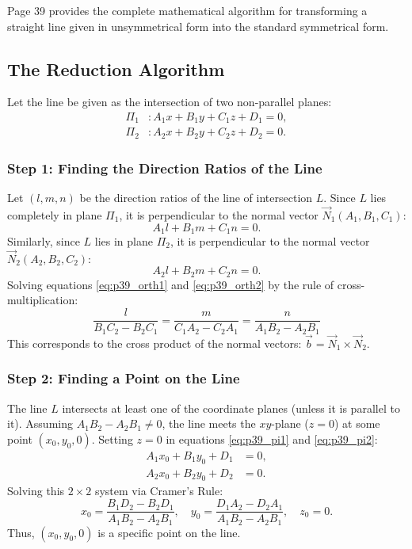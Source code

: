 \begin{conceptbox}
Page 39 provides the complete mathematical algorithm for transforming a straight line given in unsymmetrical form into the standard symmetrical form.
\end{conceptbox}

\subsection{The Reduction Algorithm}
Let the line be given as the intersection of two non-parallel planes:
\begin{align}
    \Pi_1 &: A_1 x + B_1 y + C_1 z + D_1 = 0, \label{eq:p39_pi1} \\
    \Pi_2 &: A_2 x + B_2 y + C_2 z + D_2 = 0. \label{eq:p39_pi2}
\end{align}

\subsubsection{Step 1: Finding the Direction Ratios of the Line}
Let $(l, m, n)$ be the direction ratios of the line of intersection $L$.
Since $L$ lies completely in plane $\Pi_1$, it is perpendicular to the normal vector $\vec{N}_1(A_1, B_1, C_1)$:
\begin{equation}
    A_1 l + B_1 m + C_1 n = 0. \label{eq:p39_orth1}
\end{equation}
Similarly, since $L$ lies in plane $\Pi_2$, it is perpendicular to the normal vector $\vec{N}_2(A_2, B_2, C_2)$:
\begin{equation}
    A_2 l + B_2 m + C_2 n = 0. \label{eq:p39_orth2}
\end{equation}
Solving equations \eqref{eq:p39_orth1} and \eqref{eq:p39_orth2} by the rule of cross-multiplication:
\begin{equation}
    \boxed{\frac{l}{B_1 C_2 - B_2 C_1} = \frac{m}{C_1 A_2 - C_2 A_1} = \frac{n}{A_1 B_2 - A_2 B_1}}
\end{equation}
This corresponds to the cross product of the normal vectors: $\vec{b} = \vec{N}_1 \times \vec{N}_2$.

\subsubsection{Step 2: Finding a Point on the Line}
The line $L$ intersects at least one of the coordinate planes (unless it is parallel to it).
Assuming $A_1 B_2 - A_2 B_1 \neq 0$, the line meets the $xy$-plane ($z = 0$) at some point $(x_0, y_0, 0)$.
Setting $z = 0$ in equations \eqref{eq:p39_pi1} and \eqref{eq:p39_pi2}:
\begin{align}
    A_1 x_0 + B_1 y_0 + D_1 &= 0, \\
    A_2 x_0 + B_2 y_0 + D_2 &= 0.
\end{align}
Solving this $2 \times 2$ system via Cramer's Rule:
\begin{equation}
    x_0 = \frac{B_1 D_2 - B_2 D_1}{A_1 B_2 - A_2 B_1}, \quad y_0 = \frac{D_1 A_2 - D_2 A_1}{A_1 B_2 - A_2 B_1}, \quad z_0 = 0.
\end{equation}
Thus, $(x_0, y_0, 0)$ is a specific point on the line.

